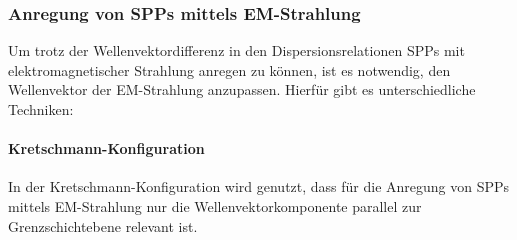 \documentclass[titlepage,  ngerman]{article}
\begin{document}
	\subsubsection{Anregung von SPPs mittels EM-Strahlung}
	\label{sec:exictation}
	Um trotz der Wellenvektordifferenz in den Dispersionsrelationen SPPs mit elektromagnetischer Strahlung anregen zu können, ist es notwendig, den Wellenvektor der EM-Strahlung anzupassen. Hierfür gibt es unterschiedliche Techniken:
	\paragraph{Kretschmann-Konfiguration}
	In der Kretschmann-Konfiguration wird genutzt, dass für die Anregung von SPPs mittels EM-Strahlung nur die Wellenvektorkomponente parallel zur Grenzschichtebene relevant ist. 
		
\end{document}
